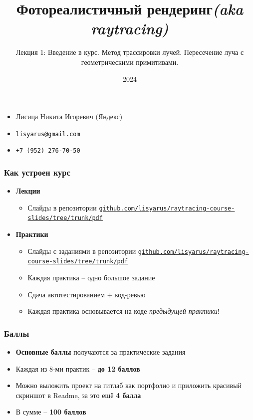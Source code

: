 \documentclass[10pt]{beamer}
\title{Фотореалистичный рендеринг\quad\quad\quad\quad\quad\quad \textit{(aka raytracing)}}
\subtitle{Лекция 1: Введение в курс. Метод трассировки лучей. Пересечение луча с геометрическими примитивами.}
\date{2024}
\begin{document}
\frame{\titlepage}

\begin{frame}
\frametitle{}
\begin{itemize}
\item Лисица Никита Игоревич (Яндекс)
\item \texttt{lisyarus@gmail.com}
\item \texttt{+7 (952) 276-70-50}
\end{itemize}
\end{frame}

\begin{frame}
\frametitle{Как устроен курс}
\begin{itemize}
\item \textbf{Лекции}
\begin{itemize}
\item Слайды в репозитории \href{https://github.com/lisyarus/raytracing-course-slides/tree/trunk/pdf}{\texttt{github.com/lisyarus/raytracing-course-slides/tree/trunk/pdf}}
\end{itemize}
\pause
\item \textbf{Практики}
\pause
\begin{itemize}
\item Слайды с заданиями в репозитории \href{https://github.com/lisyarus/raytracing-course-slides/tree/trunk/pdf}{\texttt{github.com/lisyarus/raytracing-course-slides/tree/trunk/pdf}}
\pause
\item Каждая практика -- одно большое задание
\pause
\item Сдача автотестированием + код-ревью
\pause
\item Каждая практика основывается на коде \textit{предыдущей практики}!
\end{itemize}
\end{itemize}
\end{frame}

\begin{frame}
\frametitle{Баллы}
\begin{itemize}
\pause
\item \textbf{Основные баллы} получаются за практические задания
\pause
\item Каждая из 8-ми практик -- \textbf{до 12 баллов}
\pause
\item Можно выложить проект на гитлаб как портфолио и приложить красивый скриншот в Readme, за это ещё \textbf{4 балла}
\pause
\item В сумме -- \textbf{100 баллов}
\end{itemize}
\end{frame}
\end{document}
